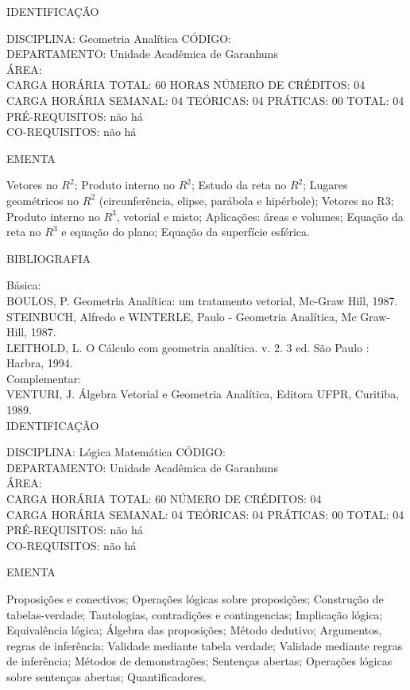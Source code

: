 \documentclass[
	12pt,				%
	openright,			%
  oneside,     %
	a4paper,			%
	chapter=TITLE,		%
	english,			%
	french,				%
	spanish,			%
	brazil				%
	]{abntex2}
\begin{document}
\begin{apendicesenv}
\newpage IDENTIFICAÇÃO

DISCIPLINA: Geometria Analítica CÓDIGO:\\
DEPARTAMENTO: Unidade Acadêmica de Garanhuns\\
ÁREA:\\
CARGA HORÁRIA TOTAL: 60 HORAS NÚMERO DE CRÉDITOS: 04\\
CARGA HORÁRIA SEMANAL: 04 TEÓRICAS: 04 PRÁTICAS: 00 TOTAL: 04\\
PRÉ-REQUISITOS: não há\\
CO-REQUISITOS: não há

EMENTA

Vetores no $R^2$; Produto interno no $R^2$; Estudo da reta no $R^2$; Lugares geométricos no $R^2$ (circunferência, elipse, parábola e hipérbole); Vetores no R3; Produto interno no $R^3$, vetorial e misto; Aplicações: áreas e volumes; Equação da reta no $R^3$ e equação do plano; Equação da superfície esférica.

BIBLIOGRAFIA

Básica:\\
BOULOS, P. Geometria Analítica: um tratamento vetorial, Mc-Graw Hill, 1987.\\
STEINBUCH, Alfredo e WINTERLE, Paulo - Geometria Analítica, Mc Graw-Hill, 1987.\\
LEITHOLD, L. O Cálculo com geometria analítica. v. 2. 3 ed. São Paulo :
Harbra, 1994.\\
Complementar:\\
VENTURI, J.   Álgebra Vetorial e Geometria Analítica, Editora UFPR, Curitiba, 1989.\\

\newpage IDENTIFICAÇÃO

DISCIPLINA: Lógica Matemática CÓDIGO:\\
DEPARTAMENTO: Unidade Acadêmica de Garanhuns\\
ÁREA: \\
CARGA HORÁRIA TOTAL: 60 NÚMERO DE CRÉDITOS: 04\\
CARGA HORÁRIA SEMANAL: 04 TEÓRICAS: 04 PRÁTICAS: 00 TOTAL: 04\\
PRÉ-REQUISITOS: não há\\
CO-REQUISITOS: não há

EMENTA

Proposições e conectivos; Operações lógicas sobre proposições;
Construção de tabelas-verdade; Tautologias, contradições e
contingencias; Implicação lógica; Equivalência lógica; Álgebra das
proposições; Método dedutivo; Argumentos, regras de inferência;
Validade mediante tabela verdade; Validade mediante regras de
inferência; Métodos de demonstrações; Sentenças abertas; Operações
lógicas sobre sentenças abertas; Quantificadores.


\end{apendicesenv}
\end{document}
